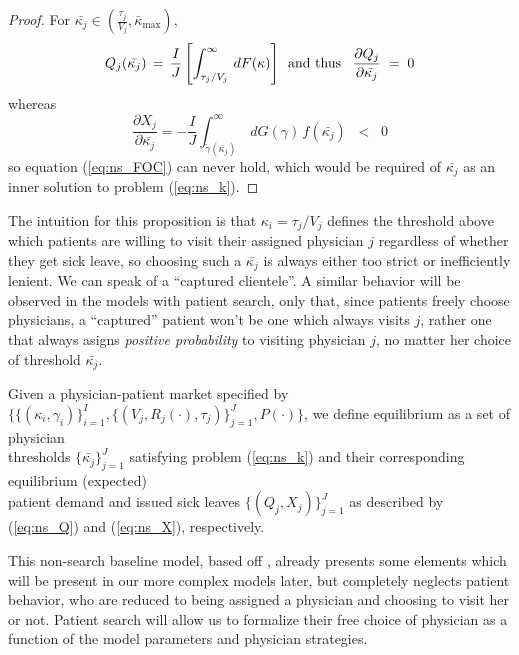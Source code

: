 \documentclass[../main.tex]{subfiles}
\begin{document}
\begin{proof}
    For $\bar{\kappa_j} \in (\frac{\tau_j}{V_j}, \bar{\kappa}_{\max})$, \vspace{-0.5em}
    {\small \[Q_j(\bar{\kappa_j}) \,=\, \frac{I}{J}\left[ \int_{\tau_j/V_j}^{\infty}\,dF(\kappa) \right] \hspace{0.5em} \text{\normalsize and thus } \hspace{0.5em} \frac{\partial Q_j}{\partial\bar{\kappa_j}} \;=\; 0\]} whereas \vspace{-0.5em}
    {\small \[  \frac{\partial X_j}{\partial\bar{\kappa_j}} = - \frac{I}{J} \int_{\tilde{\gamma}(\bar{\kappa_j})}^{\infty} \,dG(\gamma) \,f(\bar{\kappa_j}) \; \; <  \; \; 0
    \]}
    so equation (\ref{eq:ns_FOC}) can never hold, which would be required of $\bar{\kappa_j}$ as an inner solution to problem (\ref{eq:ns_k}).
\end{proof}
The intuition for this proposition is that $\kappa_i = \tau_j/V_j$ defines the threshold above which patients are willing to visit their assigned physician $j$ regardless of whether they get sick leave, so choosing such a $\bar{\kappa_j}$ is always either too strict or inefficiently lenient. We can speak of a ``captured clientele''. A similar behavior will be observed in the models with patient search, only that, since patients freely choose physicians, a ``captured'' patient won't be one which always visits $j$, rather one that always asigns \textit{positive probability} to visiting physician $j$, no matter her choice of threshold $\bar{\kappa_j}$.
\vspace{0.5em}
\begin{equilibrium}
    \label{ns_eq}
Given a physician-patient market specified by \\ $\{\{(\kappa_i,\gamma_i)\}_{i =1}^{I},\{(V_j, R_j(\cdot), \tau_j)\}_{j =1}^{J}, P(\cdot)\}$, we define equilibrium as a set of physician \\ thresholds $\{\bar{\kappa_j}\}_{j =1}^{J}$ satisfying problem (\ref{eq:ns_k}) and their corresponding equilibrium (expected)\\ patient demand and issued sick leaves $\{(Q_j,X_j)\}_{j =1}^{J}$ as described by (\ref{eq:ns_Q}) and (\ref{eq:ns_X}), respectively.
\end{equilibrium}

This non-search baseline model, based off \cite{schnell2017physician}, already presents some elements which will be present in our more complex models later, but completely neglects patient behavior, who are reduced to being assigned a physician and choosing to visit her or not. Patient search will allow us to formalize their free choice of physician as a function of the model parameters and physician strategies.
\end{document}
